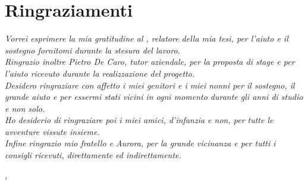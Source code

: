 
\cleardoublepage
{}
{}



\bigskip

\begingroup
\let\clearpage\relax
\let\cleardoublepage\relax
\let\cleardoublepage\relax

\chapter*{Ringraziamenti}

\noindent \textit{Vorrei esprimere la mia gratitudine al \profTitle{ }\myProf, relatore della mia tesi, per l'aiuto e il sostegno fornitomi durante la stesura del lavoro.}\\

\noindent \textit{Ringrazio inoltre Pietro De Caro, tutor aziendale, per la proposta di stage e per l'aiuto ricevuto durante la realizzazione del progetto.}\\

\noindent \textit{Desidero ringraziare con affetto i miei genitori e i miei nonni per il sostegno, il grande aiuto e per essermi stati vicini in ogni momento durante gli anni di studio e non solo.}\\

\noindent \textit{Ho desiderio di ringraziare poi i miei amici, d'infanzia e non, per tutte le avventure vissute insieme.}\\

\noindent \textit{Infine ringrazio mio fratello e Aurora, per la grande vicinanza e per tutti i consigli ricevuti, direttamente ed indirettamente.}\\
\bigskip

\noindent\textit{\myLocation, \myTime}
\hfill \myName

\endgroup


